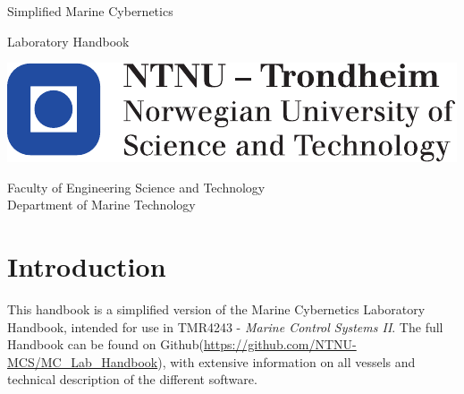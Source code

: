 \documentclass[a4paper,english]{report}
\begin{document}
\thispagestyle{empty}

\vspace*{3cm}

\begin{center}
{\LARGE{}Simplified Marine Cybernetics}
\par\end{center}{\LARGE \par}

\begin{center}
{\LARGE{}Laboratory Handbook }
\par\end{center}{\LARGE \par}

\begin{flushleft}
\vfill{}
\par\end{flushleft}

\begin{flushleft}
\includegraphics[scale=0.6]{fig/NTNU_logo.pdf}
\par\end{flushleft}

Faculty of Engineering Science and Technology\\
Department of Marine Technology

\clearpage{}\thispagestyle{empty}\vspace*{3cm}

\clearpage{}

\setcounter{page}{1}

\vspace*{3cm}

\section*{Introduction}

This handbook is a simplified version of the Marine Cybernetics Laboratory Handbook, intended for use in TMR4243 - \textit{Marine Control Systems II}. The full Handbook can be found on Github(\url{https://github.com/NTNU-MCS/MC_Lab_Handbook}), with extensive information on all vessels and technical description of the different software.
\end{document}

